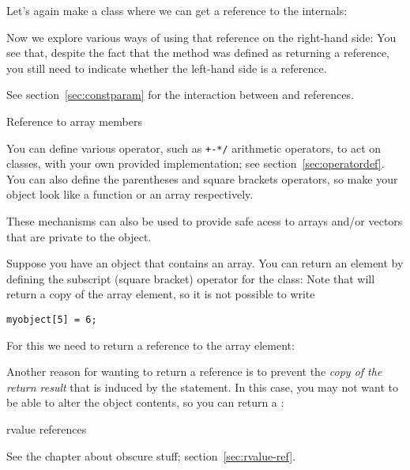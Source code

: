 Let's again make a class where we can get a reference to the
internals:
%

Now we explore various ways of using that reference on the right-hand
side:
%
%
You see that, despite the fact that the method  was defined as
returning a reference, you still need to indicate whether the
left-hand side is a reference.

See section~\ref{sec:constparam} for the interaction between 
and references.

 {Reference to array members}
\label{sec:overloadbracket}

You can define various operator, such as \verb.+-*/. arithmetic
operators, to act on classes, with your own provided implementation;
see section~\ref{sec:operatordef}. You can also define the parentheses
and square brackets operators, so make your object look like a
function or an array respectively.

These mechanisms can also be used to provide safe acess to arrays
and/or vectors that are private to the object.

Suppose you have an object that contains an  array. You can
return an element by defining the subscript (square bracket) operator
for the class:
%
%
Note that  will return a copy of the array element,
so it is not possible to write
\begin{lstlisting}
myobject[5] = 6;
\end{lstlisting}
For this we need to return a reference to the array element:
%

Another reason for wanting to return a reference is to prevent the
\emph{copy of the return result}
that is induced by the  statement.
In this case, you may not want to be able to alter the object
contents, so you can return a :
%

 {rvalue references}

See the chapter about obscure stuff; section~\ref{sec:rvalue-ref}.
